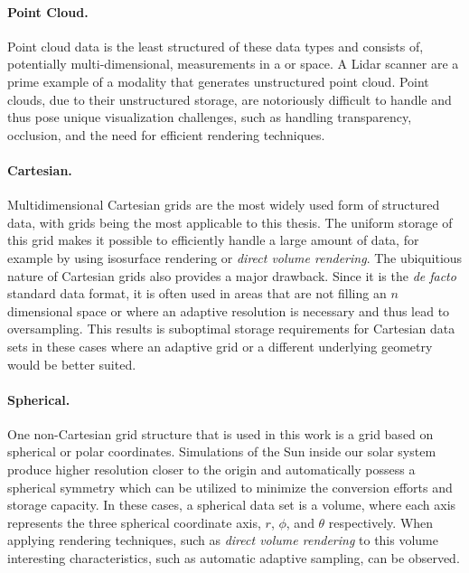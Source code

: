 \paragraph{Point Cloud. }  Point cloud data is the least structured of these data types and consists of, potentially multi-dimensional, measurements in a  or  space.  A Lidar scanner are a prime example of a modality that generates unstructured point cloud.  Point clouds, due to their unstructured storage, are notoriously difficult to handle and thus pose unique visualization challenges, such as handling transparency, occlusion, and the need for efficient rendering techniques.

\paragraph{Cartesian. }  Multidimensional Cartesian grids are the most widely used form of structured data, with  grids being the most applicable to this thesis.  The uniform storage of this grid makes it possible to efficiently handle a large amount of data, for example by using isosurface rendering or \emph{direct volume rendering}.  The ubiquitious nature of Cartesian grids also provides a major drawback.  Since it is the \emph{de facto} standard data format, it is often used in areas that are not filling an $n$ dimensional space or where an adaptive resolution is necessary and thus lead to oversampling.  This results is suboptimal storage requirements for Cartesian data sets in these cases where an adaptive grid or a different underlying geometry would be better suited.

\paragraph{Spherical. }  One non-Cartesian grid structure that is used in this work is a grid based on spherical or polar coordinates.  Simulations of the Sun inside our solar system produce higher resolution closer to the origin and automatically possess a spherical symmetry which can be utilized to minimize the conversion efforts and storage capacity.  In these cases, a spherical data set is a  volume, where each axis represents the three spherical coordinate axis, $r$, $\phi$, and $\theta$ respectively.  When applying rendering techniques, such as \emph{direct volume rendering} to this volume interesting characteristics, such as automatic adaptive sampling, can be observed.

